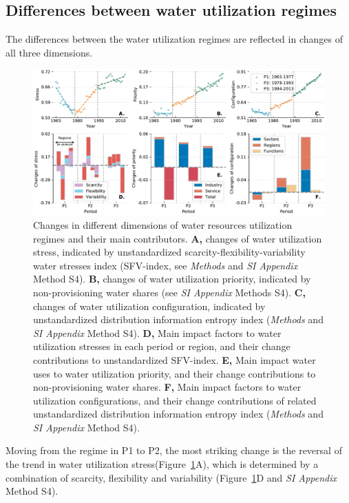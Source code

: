 \documentclass[9pt, twocolumn, twoside, lineno]{pnas-new}
\begin{document}
\subsection*{Differences between water utilization regimes}
The differences between the water utilization regimes are reflected in changes of all three dimensions.
\begin{figure}%
	\centering
	\includegraphics[width=\linewidth]{../../figures/main/dimensions.pdf}
	\caption{
		Changes in different dimensions of water resources utilization regimes and their main contributors.
		\textbf{A,} changes of water utilization stress, indicated by unstandardized scarcity-flexibility-variability water stresses index (SFV-index, see \textit{Methods} and \textit{SI Appendix} Method S4).
		\textbf{B,} changes of water utilization priority, indicated by non-provisioning water shares (see \textit{SI Appendix} Methods S4).
		\textbf{C,} changes of water utilization configuration, indicated by unstandardized distribution information entropy index (\textit{Methods} and \textit{SI Appendix} Method S4).
		\textbf{D,} Main impact factors to water utilization stresses in each period or region, and their change contributions to unstandardized SFV-index.
		\textbf{E,} Main impact water uses to water utilization priority, and their change contributions to non-provisioning water shares.
		\textbf{F,} Main impact factors to water utilization configurations, and their change contributions of related unstandardized distribution information entropy index (\textit{Methods} and \textit{SI Appendix} Method S4).
		}
	\label{fig:dimensions}
\end{figure}
Moving from the regime in P1 to P2, the most striking change is the reversal of the trend in water utilization stress(Figure~\ref{fig:dimensions}A), which is determined by a combination of scarcity, flexibility and variability (Figure~\ref{fig:dimensions}D and \textit{SI Appendix} Method S4).   
\end{document}
